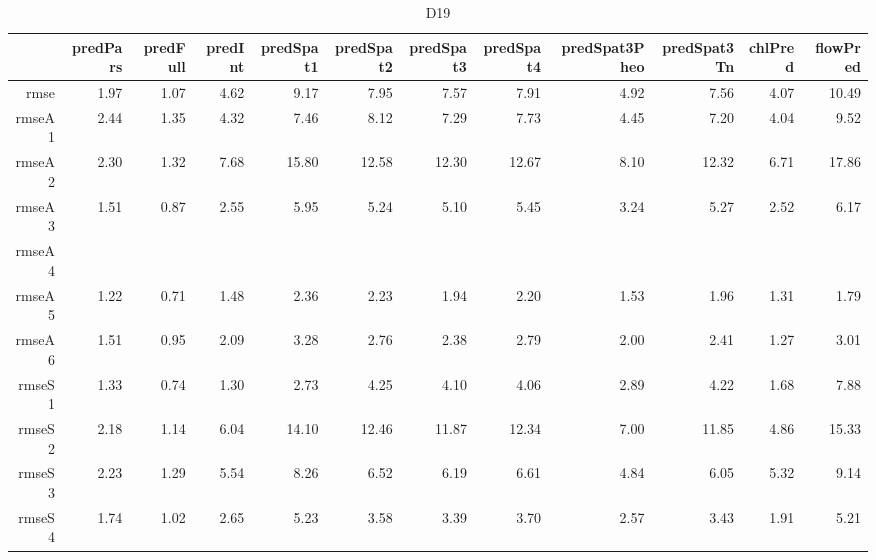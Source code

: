 \begin{table}[H]
\centering
\begingroup\fontsize{2.5pt}{4pt}\selectfont
\begin{tabular}{rrrrrrrrrrrr}
  \hline
 & predPars & predFull & predInt & predSpat1 & predSpat2 & predSpat3 & predSpat4 & predSpat3Pheo & predSpat3Tn & chlPred & flowPred \\ 
  \hline
rmse & 1.97 & 1.07 & 4.62 & 9.17 & 7.95 & 7.57 & 7.91 & 4.92 & 7.56 & 4.07 & 10.49 \\ 
  rmseA1 & 2.44 & 1.35 & 4.32 & 7.46 & 8.12 & 7.29 & 7.73 & 4.45 & 7.20 & 4.04 & 9.52 \\ 
  rmseA2 & 2.30 & 1.32 & 7.68 & 15.80 & 12.58 & 12.30 & 12.67 & 8.10 & 12.32 & 6.71 & 17.86 \\ 
  rmseA3 & 1.51 & 0.87 & 2.55 & 5.95 & 5.24 & 5.10 & 5.45 & 3.24 & 5.27 & 2.52 & 6.17 \\ 
  rmseA4 &  &  &  &  &  &  &  &  &  &  &  \\ 
  rmseA5 & 1.22 & 0.71 & 1.48 & 2.36 & 2.23 & 1.94 & 2.20 & 1.53 & 1.96 & 1.31 & 1.79 \\ 
  rmseA6 & 1.51 & 0.95 & 2.09 & 3.28 & 2.76 & 2.38 & 2.79 & 2.00 & 2.41 & 1.27 & 3.01 \\ 
  rmseS1 & 1.33 & 0.74 & 1.30 & 2.73 & 4.25 & 4.10 & 4.06 & 2.89 & 4.22 & 1.68 & 7.88 \\ 
  rmseS2 & 2.18 & 1.14 & 6.04 & 14.10 & 12.46 & 11.87 & 12.34 & 7.00 & 11.85 & 4.86 & 15.33 \\ 
  rmseS3 & 2.23 & 1.29 & 5.54 & 8.26 & 6.52 & 6.19 & 6.61 & 4.84 & 6.05 & 5.32 & 9.14 \\ 
  rmseS4 & 1.74 & 1.02 & 2.65 & 5.23 & 3.58 & 3.39 & 3.70 & 2.57 & 3.43 & 1.91 & 5.21 \\ 
   \hline
\end{tabular}
\endgroup
\caption{D19} 
\end{table}
